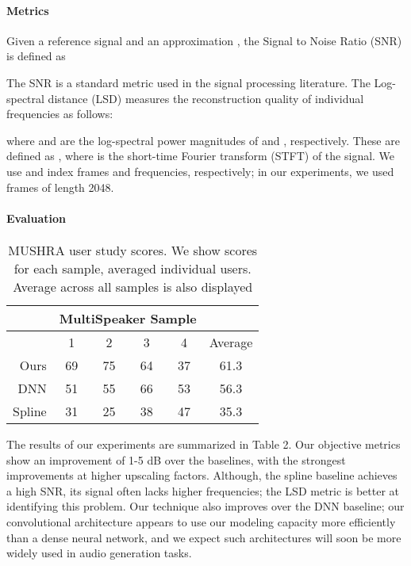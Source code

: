 \documentclass{article} \usepackage{iclr2017_workshop,times}
\begin{document}
\paragraph{Metrics}

Given a reference signal  and an approximation , the Signal to Noise Ratio (SNR) is defined as

The SNR is a standard metric used in the signal processing literature.
The Log-spectral distance (LSD) \citep{gray1976distance} measures the reconstruction quality of individual frequencies as follows:

where  and  are the log-spectral power magnitudes of  and , respectively. These are defined as , where  is the short-time Fourier transform (STFT) of the signal. We use  and  index frames and frequencies, respectively; in our experiments, we used frames of length 2048.

\paragraph{Evaluation} 

\begin{wraptable}{r}{0.5\textwidth}
\vspace{-3mm}
\begin{tabular}{rcccc|c}
& \multicolumn{4}{c}{MultiSpeaker Sample} & \\
\hline
 & 1 & 2 & 3 & 4 & Average \\
\hline
Ours & 69 & 75 & 64 & 37 & 61.3 \\
DNN & 51 & 55 & 66 &  53 & 56.3 \\
Spline & 31 & 25 & 38 & 47 & 35.3 \\
\hline
\end{tabular}
\caption{MUSHRA user study scores. We show scores for each sample, averaged individual users. Average across all samples is also displayed}
\label{mos}
\end{wraptable}

The results of our experiments are summarized in Table 2. Our objective metrics show an improvement of 1-5 dB over the baselines, with the strongest improvements at higher upscaling factors.
Although, the spline baseline achieves a high SNR, its signal often lacks higher frequencies; the LSD metric is better at identifying this problem. 
Our technique also improves over the DNN baseline; our convolutional architecture appears to use our  modeling capacity more efficiently than a dense neural network, and we expect such architectures will soon be more widely used in audio generation tasks.
\end{document}
